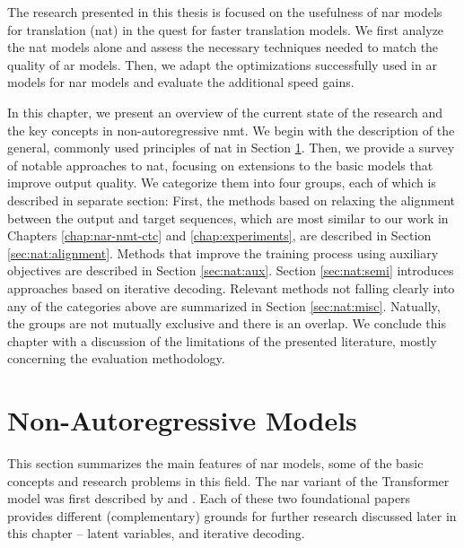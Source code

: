 The research presented in this thesis is focused on the usefulness of \ac{nar}
models for translation (\acs{nat}) in the quest for faster
translation models. We first analyze the \ac{nat} models alone and assess the
necessary techniques needed to match the quality of \ac{ar} models.  Then, we
adapt the optimizations successfully used in \ac{ar} models for \ac{nar} models
and evaluate the additional speed gains. 

In this chapter, we present an overview of the current state of the research
and the key concepts in non-autoregressive \ac{nmt}. We begin with the
description of the general, commonly used principles of \ac{nat} in Section
\ref{sec:nat:principles}. Then, we provide a survey of notable approaches to
\ac{nat}, focusing on extensions to the basic models that improve output
quality. We categorize them into four groups, each of which is described in
separate section: First, the methods based on relaxing the alignment between
the output and target sequences, which are most similar to our work in Chapters
\ref{chap:nar-nmt-ctc} and \ref{chap:experiments}, are described in Section
\ref{sec:nat:alignment}. Methods that improve the training process using
auxiliary objectives are described in Section \ref{sec:nat:aux}. Section
\ref{sec:nat:semi} introduces approaches based on iterative decoding. Relevant
methods not falling clearly into any of the categories above are summarized in
Section \ref{sec:nat:misc}. Natually, the groups are not mutually exclusive and
there is an overlap. We conclude this chapter with a discussion of the
limitations of the presented literature, mostly concerning the evaluation
methodology.


\section{Non-Autoregressive Models}%
\label{sec:nat:principles}

This section summarizes the main features of \ac{nar} models, some of the basic
concepts and research problems in this field. The \ac{nar} variant of the
Transformer model was first described by \citet{gu2017nonautoregressive} and
\citet{lee-etal-2018-deterministic}. Each of these two foundational papers
provides different (complementary) grounds for further research discussed later
in this chapter -- latent variables, and iterative decoding.

